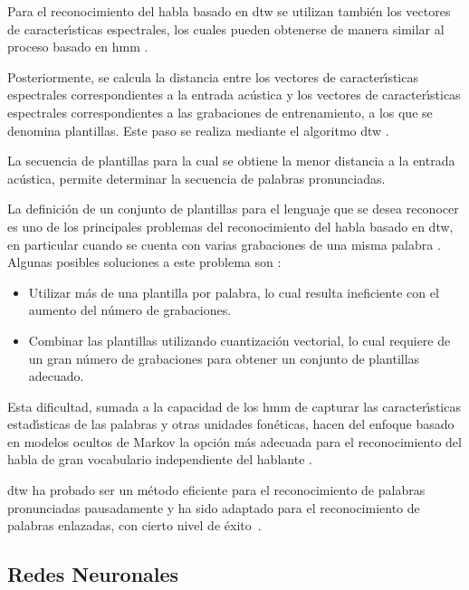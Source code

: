 Para el reconocimiento del habla basado en \gls{dtw} se utilizan tambi\'en los vectores de 
caracter{\'\i}sticas espectrales, los cuales pueden obtenerse de manera similar al proceso 
basado en \gls{hmm} \cite{Hachkar2011}.

Posteriormente, se calcula la distancia entre los vectores de caracter{\'\i}sticas 
espectrales correspondientes a la entrada ac\'ustica y los vectores de caracter{\'\i}sticas 
espectrales correspondientes a las grabaciones de entrenamiento, a los que se denomina plantillas. 
Este paso se realiza mediante el algoritmo \gls{dtw} \cite{Muda2010}.

La secuencia de plantillas para la cual se obtiene la menor distancia a la entrada ac\'ustica,
permite determinar la secuencia de palabras pronunciadas.

La definici\'on de un conjunto de plantillas para el lenguaje que se desea reconocer es uno de
los principales problemas del reconocimiento del habla basado en \gls{dtw}, en particular cuando 
se cuenta con varias grabaciones de una misma palabra \cite{Abdulla2003}. 
Algunas posibles soluciones a este problema son \cite{Abdulla2003}:

\vspace*{1\baselineskip}
\begin{itemize}
    \item Utilizar m\'as de una plantilla por palabra, lo cual resulta ineficiente con el aumento del
    n\'umero de grabaciones.
    \item Combinar las plantillas utilizando cuantizaci\'on vectorial, lo cual requiere de un gran
    n\'umero de grabaciones para obtener un conjunto de plantillas adecuado.
\end{itemize}

Esta dificultad, sumada a la capacidad de los \gls{hmm} de capturar las caracter{\'\i}sticas 
estad{\'\i}sticas de las palabras y otras unidades fon\'eticas, hacen del enfoque basado en modelos
ocultos de Markov la opci\'on m\'as adecuada para el reconocimiento del habla de gran 
vocabulario independiente del hablante \cite{Wong1998}.

\gls{dtw} ha probado ser un m\'etodo eficiente para el reconocimiento de palabras pronunciadas 
pausadamente \cite{MyersALevel1981} y ha sido adaptado para el reconocimiento de palabras enlazadas,
con cierto nivel de \mbox{\'exito \cite{MyersALevel1981, SakoeTwoLevel1979, RabinerApplication1980}}.


\subsection{Redes Neuronales}
\label{sec:otrosModelosANN}


